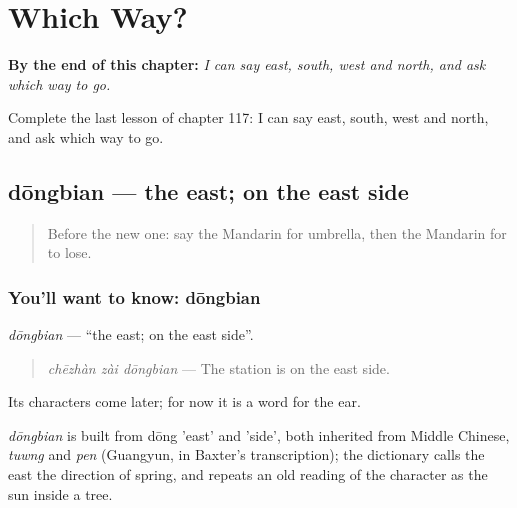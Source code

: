 
\chapter{Which Way?}
\label{ch:zh-which-way}

\begin{chapteropening}
\textbf{By the end of this chapter:} \emph{I can say east, south, west and north, and ask which way to go.}

Complete the last lesson of chapter 117: I can say east, south, west and north, and ask which way to go.
\end{chapteropening}

\section[dōngbian]{dōngbian — the east; on the east side}

\label{lesson:ZH-C117-dongbian}



\begin{quote}
Before the new one: say the Mandarin for umbrella, then the Mandarin for to lose.
\end{quote}

\subsection*{You'll want to know: dōngbian}
\emph{dōngbian} — \textquotedblleft{}the east; on the east side\textquotedblright{}.

\begin{quote}
\emph{chēzhàn zài dōngbian} — The station is on the east side.
\end{quote}

Its characters come later; for now it is a word for the ear.

\begin{cousinweb}
\emph{dōngbian} is built from dōng 'east' and  'side', both inherited from Middle Chinese, \emph{tuwng} and \emph{pen} (Guangyun, in Baxter's transcription); the dictionary calls the east the direction of spring, and repeats an old reading of the character as the sun inside a tree.
\end{cousinweb}

